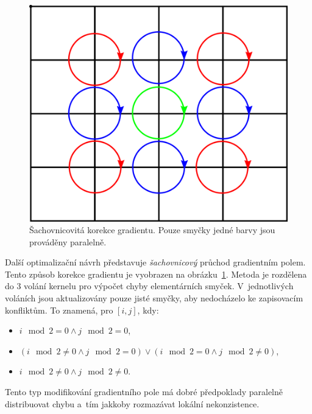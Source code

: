 \documentclass[11pt,a4paper,oneside]{article}
\begin{document}
	\begin{figure}[htb]
		\centering
		\includegraphics[scale=0.3]{fig/chess.png}
		\caption{Šachovnicovitá korekce gradientu. Pouze smyčky jedné barvy jsou prováděny paralelně.}
		\label{fig:chess}
	\end{figure}

	Další optimalizační návrh představuje \emph{šachovnicový} průchod gradientním polem. Tento způsob
	korekce gradientu je vyobrazen na obrázku~\ref{fig:chess}. Metoda je rozdělena do 3 volání kernelu
	pro výpočet chyby elementárních smyček. V~jednotlivých voláních jsou aktualizovány pouze jisté smyčky,
	aby nedocházelo ke zapisovacím konfliktům. To znamená, pro $[i, j]$, kdy:
	\begin{itemize}
		\item $i \mod 2 = 0 \wedge j \mod 2 = 0$,
		\item $(i \mod 2 \neq 0 \wedge j \mod 2 = 0) \lor (i \mod 2 = 0 \wedge j \mod 2 \neq 0)$,
		\item $i \mod 2 \neq 0 \wedge j \mod 2 \neq 0$.
	\end{itemize}
	Tento typ modifikování gradientního pole má dobré předpoklady paralelně distribuovat chybu
	a~tím jakkoby rozmazávat lokální nekonzistence.
\end{document}
